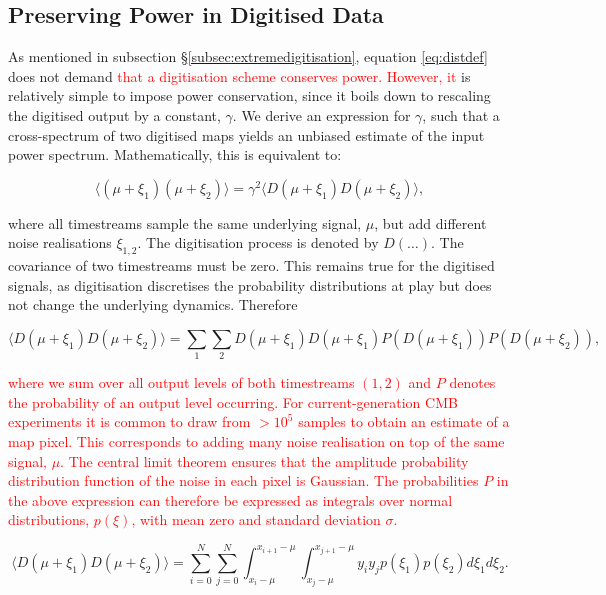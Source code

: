 \documentclass[apj]{emulateapj}
\newcommand{\changed}[1]{\textcolor{Red}{#1}}
\begin{document}
\subsection{Preserving Power in Digitised Data}
\label{subsec:appendixpreservepower}

As mentioned in subsection \S\ref{subsec:extremedigitisation}, equation \ref{eq:distdef} does not demand \changed{that a digitisation scheme conserves power. However, it} is relatively simple to impose power conservation, since it boils down to rescaling the digitised output by a constant, $\gamma$. We derive an expression for $\gamma$, such that a cross-spectrum of two digitised maps yields an unbiased estimate of the input power spectrum. Mathematically, this is equivalent to:

\begin{equation} \label{eq:normcrosspower}
\langle (\mu + \xi_1) (\mu + \xi_2) \rangle = \gamma^2 \langle D(\mu + \xi_1) D(\mu + \xi_2) \rangle,
\end{equation}

where all timestreams sample the same underlying signal, $\mu$, but add different noise realisations $\xi_{1, 2}$. The digitisation process is denoted by $D(\dots)$. The covariance of two timestreams must be zero. This remains true for the digitised signals, as digitisation discretises the probability distributions at play but does not change the underlying dynamics. Therefore

\begin{equation}
\langle D(\mu + \xi_1) D(\mu + \xi_2) \rangle = \sum_1 \sum_2 D(\mu + \xi_1) D(\mu + \xi_1) P(D(\mu + \xi_1)) P(D(\mu + \xi_2)),
\end{equation}

\changed{ where we sum over all output levels of both timestreams $(1, 2)$ and $P$ denotes the probability of an output level occurring. For current-generation CMB experiments it is common to draw from $>10^5$ samples to obtain an estimate of a map pixel. This corresponds to adding many noise realisation on top of the same signal, $\mu$. 
The central limit theorem ensures that the amplitude probability distribution function of the noise in each pixel is Gaussian. 
The probabilities $P$ in the above expression can therefore be expressed as integrals over normal distributions, $p(\xi)$, with mean zero and standard deviation $\sigma$.}

\begin{equation}
\langle D(\mu + \xi_1) D(\mu + \xi_2) \rangle = \sum_{i=0}^N \sum_{j=0}^N  \int_{x_i-\mu}^{x_{i+1}-\mu} \int_{x_j-\mu}^{x_{j+1}-\mu} y_i y_j p(\xi_1) p(\xi_2) d\xi_1 d\xi_2.
\end{equation}
\end{document}
